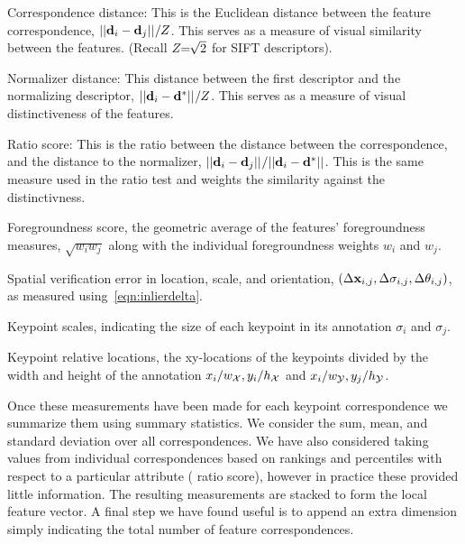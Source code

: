 \begin{itemln}

    \item Correspondence distance:
    This is the Euclidean distance between the feature correspondence, $||\mathbf{d}_i - \mathbf{d}_j||_{} / Z$.
    This serves as a measure of visual similarity between the features.
    (Recall $Z\mkern-6mu=\mkern-6mu\sqrt{2}$ for SIFT descriptors).

    \item Normalizer distance:
    This distance between the first descriptor and the normalizing descriptor, %
        $||\mathbf{d}_i - \mathbf{d}^{*}||_{} / Z$.
        This serves as a measure of visual distinctiveness of the features.

    \item Ratio score:
    This is the ratio between the distance between the correspondence, and the distance to the normalizer, %
        $||\mathbf{d}_i - \mathbf{d}_j||_{} / ||\mathbf{d}_i - \mathbf{d}^{*}||_{}$.
        This is the same measure used in the ratio test and weights the similarity against the distinctivness.

    \item Foregroundness score, the geometric average of the features' foregroundness measures, $\sqrt{w_i w_j}$
      along with the individual foregroundness weights $w_i$ and $w_j$.
        
    \item Spatial verification error in location, scale, and orientation, $( %
        \Delta \pt_{i, j}, %
        \Delta \scale_{i, j}, %
        \Delta \ori_{i, j})$, as measured using~\cref{eqn:inlierdelta}.

    \item Keypoint scales, indicating the size of each keypoint in its annotation $\sigma_i$ and $\sigma_j$.

    \item Keypoint relative locations, the xy-locations of the keypoints divided by the width and height of the
      annotation $x_i / w_{\mathcal{X}}, y_i / h_{\mathcal{X}}$ and $x_i / w_{\mathcal{Y}}, y_j / h_{\mathcal{Y}}$.
\end{itemln}

Once these measurements have been made for each keypoint correspondence we summarize them using summary
  statistics.
We consider the sum, mean, and standard deviation over all correspondences.
We have also considered taking values from individual correspondences based on rankings and percentiles with
  respect to a particular attribute (\eg{} ratio score), however in practice these provided little information.
The resulting measurements are stacked to form the local feature vector.
A final step we have found useful is to append an extra dimension simply indicating the total number of feature
  correspondences.

